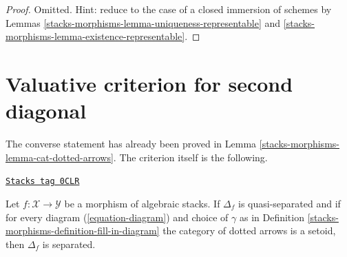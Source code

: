 \begin{proof}
Omitted. Hint: reduce to the case of a closed immersion of
schemes by Lemmas \ref{stacks-morphisms-lemma-uniqueness-representable} and
\ref{stacks-morphisms-lemma-existence-representable}.
\end{proof}

\section{Valuative criterion for second diagonal}
\label{stacks-morphisms-section-valuative-second}
The converse statement has already been proved in
Lemma \ref{stacks-morphisms-lemma-cat-dotted-arrows}.
The criterion itself is the following.

\begin{lemma}
\label{stacks-morphisms-lemma-setoids-and-diagonal}
\href{https://stacks.math.columbia.edu/tag/0CLR}{\texttt{Stacks tag 0CLR}}

Let $f : \mathcal{X} \to \mathcal{Y}$ be a morphism of algebraic stacks.
If $\Delta_f$ is quasi-separated and if for every diagram
(\ref{equation-diagram}) and choice of $\gamma$ as in
Definition \ref{stacks-morphisms-definition-fill-in-diagram}
the category of dotted arrows
is a setoid, then $\Delta_f$ is separated.
\end{lemma}

